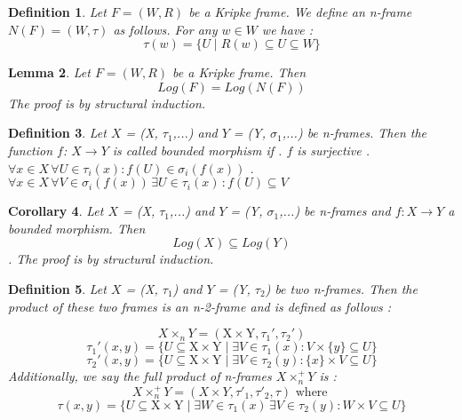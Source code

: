 \documentclass[12pt, a4paper]{scrartcl}
\newtheorem{definition}{Definition}[subsection]
\newtheorem{lemma}[definition]{Lemma}
\newtheorem{corollary}[definition]{Corollary}
\begin{document}
\begin{definition}
    Let $F = (W,R)$ be a Kripke frame. We define an n-frame $N(F) = (W, \tau)$ as follows.
    For any $w\in W$ we have :
    $$\tau(w) = \{ U \mid R(w) \subseteq U \subseteq W \}$$
        
\end{definition}

\vspace{0.5cm}
\begin{lemma}

    Let $F = (W,R)$ be a Kripke frame. Then $$Log(F) = Log(N(F))$$ 
    The proof is by structural induction.
\end{lemma}

\vspace{0.5cm}

\begin{definition}
    Let $X$ = (X, $\tau_1$,...) and $Y$ = (Y, $\sigma_1$,...) be n-frames. Then the function $f$:
    $X \rightarrow Y$ is called bounded morphism if \newline {}. $f$ is surjective . $\forall x\in X \, \forall U \in \tau_i(x) : f(U) \in \sigma_i (f(x))$ . $\forall x\in X \, \forall V \in \sigma_i (f(x)) \, \exists U \in \tau_i(x) \, : f(U) \subseteq V$        
\end{definition}

\begin{corollary}
     Let $X$ = (X, $\tau_1$,...) and $Y$ = (Y, $\sigma_1$,...) be n-frames and $f : X \rightarrow Y$ a bounded morphism. Then 
     $$Log(X) \subseteq Log(Y)$$. \newline
     The proof is by structural induction.
\end{corollary}

\vspace{0.5cm}

\begin{definition}
    Let $X$ = (X, $\tau_1$) and $Y$ = (Y, $\tau_2$) be two n-frames. Then the product of these two frames
    is an n-2-frame and is defined as follows : \newline
    
    $$ X \times_n Y = (\mbox{X} \times \mbox{Y}, \tau_1', \tau_2')$$   
    $$ \tau_1'(x,y) = \{ U \subseteq \mbox{X} \times \mbox{Y} \mid \exists V \in \tau_1(x) : V \times  \{ y \} \subseteq U \}$$
    $$ \tau_2'(x,y) = \{ U \subseteq \mbox{X} \times \mbox{Y} \mid \exists V \in \tau_2(y) : \{ x \} \times V \subseteq U \}$$
    Additionally, we say the full product of n-frames $X \times^+_n Y$ is :
    $$ X \times^+_n Y = (X \times Y, \tau'_1, \tau'_2, \tau)\mbox{ where }$$
    $$ \tau(x,y) = \{ U \subseteq \mbox{X} \times \mbox{Y} \mid \exists W \in \tau_1(x) \, \exists V \in \tau_2(y) : W \times V \subseteq U \}$$        
\end{definition}
\end{document}
